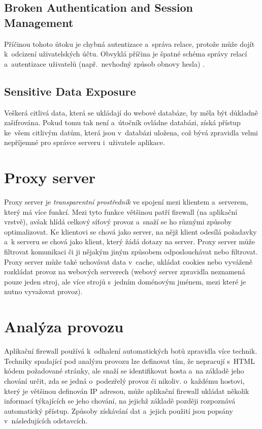 \subsection*{Broken Authentication and Session Management}
Příčinou tohoto útoku je chybná autentizace a~správa relace, protože může dojít k~odcizení uživatelských účtu. Obvyklá příčina je špatné schéma správy relací a~autentizace uživatelů (např.~nevhodný způsob obnovy hesla) \cite{bib:XSS_vut}.

\subsection*{Sensitive Data Exposure}
Veškerá citlivá data, která se ukládají do webové databáze, by měla být důkladně zašifrována. Pokud tomu tak není a~útočník ovládne databázi, získá přístup ke~všem citlivým datům, která jsou v~databázi uložena, což bývá zpravidla velmi nepříjemné pro správce serveru i~uživatele aplikace.

\section{Proxy server}
\label{sec:proxy_server}
Proxy server je \textit{transparentní prostředník} ve spojení mezi klientem a~serverem, který má více funkcí. Mezi tyto funkce většinou patří firewall (na aplikační vrstvě), avšak hlídá celkový síťový provoz a~snaží se ho různými způsoby optimalizovat. Ke klientovi se chová jako server, na nějž klient odesílá požadavky a~k serveru se chová jako klient, který žádá dotazy na server. Proxy server může filtrovat komunikaci či ji nějakým jiným způsobem odposlouchávat nebo filtrovat. Proxy server může také uchovávat data v~cache, ukládat cookies nebo vyváženě rozkládat provoz na webových serverech (webový server zpravidla neznamená pouze jeden stroj, ale více strojů s~jedním doménovým jménem, mezi které je nutno vyvažovat provoz). 

\section{Analýza provozu}
Aplikační firewall používá k~odhalení automatických botů zpravidla více technik. Techniky spadající pod analýzu provozu lze definovat tím, že nepracují s~HTML kódem požadované stránky, ale snaží se identifikovat hosta a~na základě jeho chování určit, zda se jedná o~podezřelý provoz či nikoliv. o~každému hostovi, který je většinou definován IP adresou, může aplikační firewall ukládat několik informací týkajících se jeho chování, na jejichž základě později rozpoznává automatický přístup. Způsoby získávání dat a~jejich použití jsou popsány v~následujících odstavcích.

